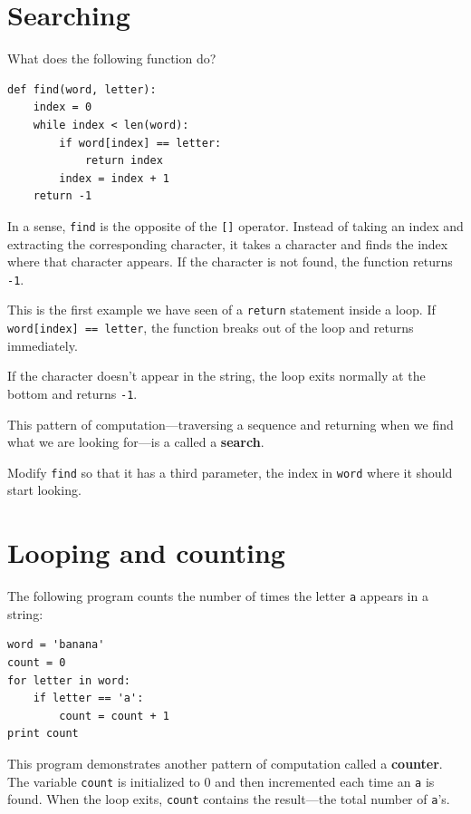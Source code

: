 \documentclass[10pt]{book}
\begin{document}
\section{Searching}
\label{find}

What does the following function do?



\beforeverb
\beforeverb
\begin{verbatim}
def find(word, letter):
    index = 0
    while index < len(word):
        if word[index] == letter:
            return index
        index = index + 1
    return -1
\end{verbatim}
\afterverb
%
In a sense, {\tt find} is the opposite of the {\tt []} operator.
Instead of taking an index and extracting the corresponding character,
it takes a character and finds the index where that character
appears.  If the character is not found, the function returns {\tt
-1}.

This is the first example we have seen of a {\tt return} statement
inside a loop.  If {\tt word[index] == letter}, the function breaks
out of the loop and returns immediately.

If the character doesn't appear in the string, the loop
exits normally at the bottom and returns {\tt -1}.

This pattern of computation---traversing a sequence and returning
when we find what we are looking for---is a called a {\bf search}.


\begin{ex}
Modify {\tt find} so that it has a
third parameter, the index in {\tt word} where it should start
looking.
\end{ex}


\section{Looping and counting}
\label{counter}


The following program counts the number of times the letter {\tt a}
appears in a string:

\beforeverb
\begin{verbatim}
word = 'banana'
count = 0
for letter in word:
    if letter == 'a':
        count = count + 1
print count
\end{verbatim}
\afterverb
%
This program demonstrates another pattern of computation called a {\bf
counter}.  The variable {\tt count} is initialized to 0 and then
incremented each time an {\tt a} is found.
When the loop exits, {\tt count}
contains the result---the total number of {\tt a}'s.
\end{document}

